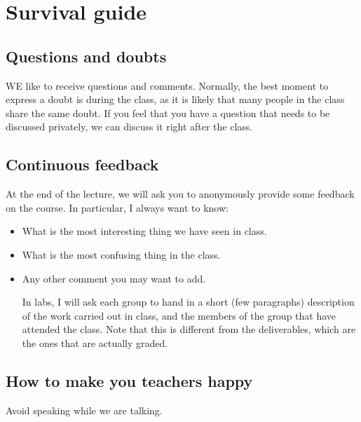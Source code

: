 \section{Survival guide}

\subsection{Questions and doubts}
WE like to receive questions and comments.
Normally, the best moment to express a doubt is during the class, as it is likely that many people in the class share the same doubt.
If you feel that you have a question that needs to be discussed privately, we can discuss it right after the class.

\subsection{Continuous feedback}
At the end of the lecture, we will ask you to anonymously provide some feedback on the course. 
In particular, I always want to know:
\begin{itemize}
\item What is the most interesting thing we have seen in class.
\item What is the most confusing thing in the class.
\item Any other comment you may want to add.

In labs, I will ask each group to hand in a short (few paragraphs) description of the work carried out in class, and the members of the group that have attended the class.
Note that this is different from the deliverables, which are the ones that are actually graded.
\end{itemize}

\subsection{How to make you teachers happy}

Avoid speaking while we are talking.
